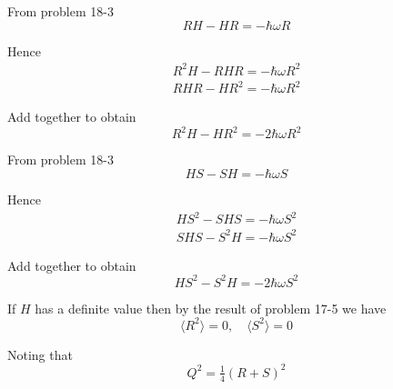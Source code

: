


\bigskip
From problem 18-3
\begin{equation*}
RH-HR=-\hbar\omega R
\end{equation*}

Hence
\begin{align*}
R^2H-RHR=-\hbar\omega R^2
\\
RHR-HR^2=-\hbar\omega R^2
\end{align*}

Add together to obtain
\begin{equation*}
R^2H-HR^2=-2\hbar\omega R^2
\end{equation*}

From problem 18-3
\begin{equation*}
HS-SH=-\hbar\omega S
\end{equation*}

Hence
\begin{align*}
HS^2-SHS=-\hbar\omega S^2
\\
SHS-S^2H=-\hbar\omega S^2
\end{align*}

Add together to obtain
\begin{equation*}
HS^2-S^2H=-2\hbar\omega S^2
\end{equation*}

If $H$ has a definite value then by the result of problem 17-5 we have
\begin{equation*}
\langle R^2\rangle=0,\quad\langle S^2\rangle=0
\end{equation*}

Noting that
\begin{equation*}
Q^2=\tfrac{1}{4}(R+S)^2
\end{equation*}

